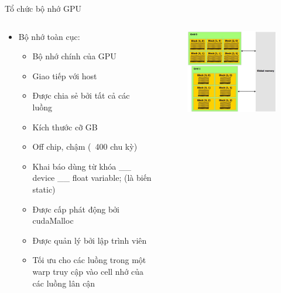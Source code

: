 \documentclass[10pt]{beamer}
\theoremstyle{remark}
\numberwithin{algocf}{section}
\numberwithin{equation}{section}
\numberwithin{dl}{section}
\numberwithin{figure}{section}
\begin{document}
\begin{frame}{Tổ chức bộ nhớ GPU}
    \begin{columns}[onlytextwidth]
        \begin{column}{0.5\linewidth}
            \begin{itemize}
                \item Bộ nhớ toàn cục:
                \begin{itemize}
                    \item Bộ nhớ chính của GPU
                    \item Giao tiếp với host
                    \item Được chia sẻ bởi tất cả các luồng 
                    \item Kích thước cỡ GB 
                    \item Off chip, chậm (~400 chu kỳ)
                    \item Khai báo dùng từ khóa \_\_ device \_\_ float variable; (là biến static)
                    \item Được cấp phát động bởi cudaMalloc
                    \item Được quản lý bởi lập trình viên
                    \item Tối ưu cho các luồng trong một warp truy cập vào cell nhớ của các luồng lân cận
                \end{itemize}
            \end{itemize}
        \end{column}
        \begin{column}{0.5\linewidth}
            \begin{figure}[H]
                \centering
                \includegraphics[width=\linewidth]{figures/CUDA/GPU_Global_Memory.png}
            \end{figure}
        \end{column}
    \end{columns}
\end{frame}
\end{document}
